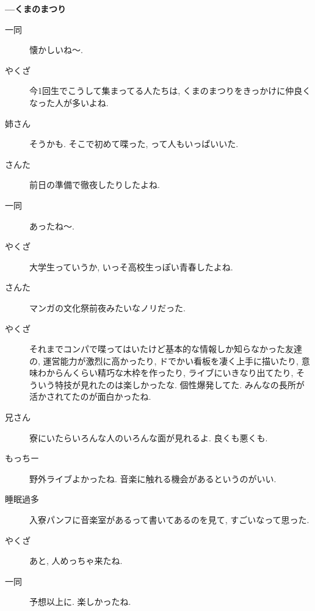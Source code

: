 \documentclass[10pt,b5jsbook,dvips,dvipdfmx,openany]{jsbook}
\theoremstyle{definition}
\begin{document}
\begin{multicols}{2}
		\textbf{---くまのまつり}
		\begin{description}
		\item[ 一同 ]懐かしいね〜. 
		\item[やくざ]今1回生でこうして集まってる人たちは, くまのまつりをきっかけに仲良くなった人が多いよね. 
		\item[姉さん]そうかも. そこで初めて喋った, って人もいっぱいいた. 
		\item[さんた]前日の準備で徹夜したりしたよね. 
		\item[ 一同 ]あったね〜. 
		\item[やくざ]大学生っていうか, いっそ高校生っぽい青春したよね. 
		\item[さんた]マンガの文化祭前夜みたいなノリだった. 
		\item[やくざ]それまでコンパで喋ってはいたけど基本的な情報しか知らなかった友達の, 運営能力が激烈に高かったり, ドでかい看板を凄く上手に描いたり, 意味わからんくらい精巧な木枠を作ったり, ライブにいきなり出てたり, そういう特技が見れたのは楽しかったな. 個性爆発してた. みんなの長所が活かされてたのが面白かったね. 
		\item[兄さん]寮にいたらいろんな人のいろんな面が見れるよ. 良くも悪くも. 
		\item[もっちー]野外ライブよかったね. 音楽に触れる機会があるというのがいい. 
		\item[睡眠過多]入寮パンフに音楽室があるって書いてあるのを見て, すごいなって思った. 
		\item[やくざ]あと, 人めっちゃ来たね. 
		\item[ 一同 ]予想以上に. 楽しかったね. 
		\end{description}


\end{multicols}
\end{document}
